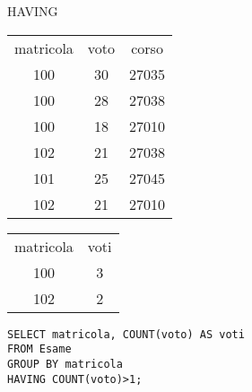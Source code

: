 \begin{frame}{HAVING}
\begin{table}[h]
\centering
\begin{minipage}{.45\textwidth}
\centering
\begin{tabular}{|c|c|c|}
\hline
\rowcolor{cyan!30} \multicolumn{3}{|c|}{Esame} \\
\hline
\rowcolor{cyan!30} matricola  & voto & corso \\
\hline
100  & 30 & 27035 \\
100  & 28 & 27038 \\
100  & 18 & 27010 \\
102  & 21 & 27038 \\
101  & 25 & 27045 \\
102 & 21 & 27010 \\
\hline
\end{tabular}
\end{minipage}%
\begin{minipage}{.45\textwidth}
\centering
\begin{tabular}{|c|c|}
\hline
\rowcolor{cyan!30} \multicolumn{2}{|c|}{Result} \\
\hline
\rowcolor{cyan!30} matricola  & voti \\
\hline
100  & 3 \\
102  & 2  \\
\hline
\end{tabular}
\end{minipage}
\end{table}
\vspace{2em}
\texttt{SELECT matricola, COUNT(voto) AS voti\\FROM Esame\\GROUP BY matricola\\HAVING COUNT(voto)>1;}
\end{frame}
